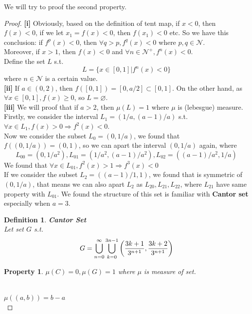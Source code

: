 \documentclass[12pt]{article}
\theoremstyle{plain}
\newtheorem{definition}{\textbf{Definition}}[section]
\newtheorem{property}{\textbf{Property}}[section]
\newtheorem{proof}{\textit{PROOF}}[section]
\begin{document}
We will try to proof the second property.
{\color{blue}
\begin{proof} \textbf{[i]} Obviously, based on the definition of tent map, if $x < 0$, then $f(x) < 0$, if we let $x_1 = f(x) < 0$, then $f(x_1) < 0$ etc. So we have this conclusion: if $f^p(x) < 0$, then $\forall q > p, f^q(x) < 0$ where $p, q \in \mathcal N$.
\\\noindent Moreover, if $x > 1$, then $f(x) < 0$ and $\forall n \in \mathcal N^+, f^n(x) < 0$.
\\[1ex]\noindent Define the set $L$ s.t.
$$
L = \{x \in [0, 1] | f^n(x) < 0\}
$$
where $n\in \mathcal N$ is a certain value.
\\\noindent \textbf{[ii]} If $a \in (0, 2)$, then $f([0, 1]) = [0, a/2] \subset [0, 1]$. On the other hand, as $\forall x \in [0, 1], f(x) \geq 0$, so $L = \varnothing$.
\\\noindent \textbf{[iii]} We will proof that if $a > 2$, then $\mu(L) = 1$ where $\mu$ is (lebesgue) measure. Firstly, we consider the interval $L_1 = (1/a, (a-1)/a)$ s.t. $\forall x \in L_1, f(x) > 0 \Rightarrow f^2(x) < 0$.
\\\noindent Now we consider the subset $L_0 = (0, 1/a)$, we found that $f\left((0, 1/a)\right) = (0, 1)$, so we can apart the interval $(0, 1/a)$ again, where 
$$
L_{00} = (0, 1/a^2), L_{01} = (1/a^2, (a-1)/a^2) , L_{02} = ((a-1)/a^2, 1/a)
$$
We found that $\forall x \in L_{01}, f^2(x) > 1 \Rightarrow f^3(x) < 0$
\\\noindent If we consider the subset $L_{2} = ((a-1)/1, 1)$, we found that is symmetric of $(0, 1/a)$, that means we can also apart $L_2$ as $L_{20}, L_{21}, L_{22}$, where $L_{21}$ have same property with $L_{01}$. We found the structure of this set is familiar with \textbf{Cantor set} especially when $a = 3$.

{\color{black}
\newpage
\begin{definition}\textbf{Cantor Set}
\\\noindent Let set $G$ s.t. 
$$
G = \bigcup_{n = 0}^{\infty}\bigcup_{k = 0}^{3n-1}\left({3k+1\over 3^{n+1}}, {3k+2\over 3^{n+1}}\right)
$$
\end{definition}

\begin{property} $\mu(C) = 0, \mu(G) = 1$ where $\mu$ is measure of set.
\end{property}
\\\noindent $\mu\left((a, b)\right) = b-a$  
\\\noindent {}

}
\end{proof}}
\end{document}

